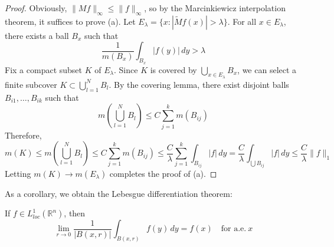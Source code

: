 \begin{proof}
    Obviously, $\|M f\|_\infty \leq \|f\|_\infty$, so by the Marcinkiewicz interpolation theorem, it suffices to prove (a).
Let $E_\lambda = \{x : |\tilde{M} f(x)| > \lambda\}$. For all $x \in E_\lambda$, there exists a ball $B_x$ such that
$$
\frac{1}{m(B_x)} \int_{B_x} |f(y)| \, dy > \lambda
$$
Fix a compact subset $K$ of $E_\lambda$. Since $K$ is covered by $\bigcup_{x \in E_\lambda} B_x$, we can select a finite subcover $K \subset \bigcup_{l=1}^N B_l$. By the covering lemma, there exist disjoint balls $B_{i1}, \ldots, B_{ik}$ such that
$$
m\left(\bigcup_{l=1}^N B_l\right) \leq C \sum_{j=1}^k m(B_{ij})
$$
Therefore,
$$
m(K) \leq m\left(\bigcup_{l=1}^N B_l\right) \leq C \sum_{j=1}^k m(B_{ij}) \leq \frac{C}{\lambda} \sum_{j=1}^k \int_{B_{ij}} |f| \, dy = \frac{C}{\lambda} \int_{\bigcup B_{ij}} |f| \, dy \leq \frac{C}{\lambda} \|f\|_1
$$
Letting $m(K) \to m(E_\lambda)$ completes the proof of (a).
\end{proof} 

As a corollary, we obtain the Lebesgue differentiation theorem:
\begin{theorem}
    If $f \in L_{loc}^1(\mathbb{R}^n)$, then
$$
\lim_{r \to 0} \frac{1}{|B(x, r)|} \int_{B(x, r)} f(y) \, dy = f(x) \quad \text{for a.e.} ~  x
$$
\end{theorem}
